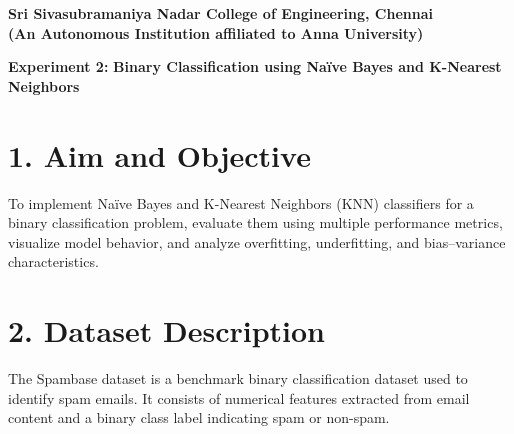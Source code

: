 \documentclass[11pt]{article}
\begin{document}
\begin{center}
\textbf{\Large Sri Sivasubramaniya Nadar College of Engineering, Chennai}\\
\textbf{(An Autonomous Institution affiliated to Anna University)}
\end{center}

\begin{table}[h]
\renewcommand{\arraystretch}{1.4}
\end{table}

\begin{center}
\textbf{ Experiment 2:}
\textbf{Binary Classification using Naïve Bayes and K-Nearest Neighbors}
\end{center}


\section*{1. Aim and Objective}
To implement Naïve Bayes and K-Nearest Neighbors (KNN) classifiers for a binary classification problem, evaluate them using multiple performance metrics, visualize model behavior, and analyze overfitting, underfitting, and bias–variance characteristics.


\section*{2. Dataset Description}
The Spambase dataset is a benchmark binary classification dataset used to identify spam emails. It consists of numerical features extracted from email content and a binary class label indicating spam or non-spam.
\end{document}
